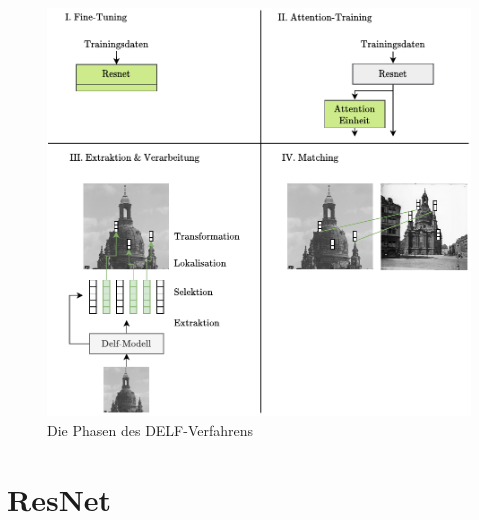 \begin{figure}[H]

\includegraphics[scale=1.0]{delf_stages.pdf}
\caption{Die Phasen des DELF-Verfahrens}
\label{delf_stages}
\end{figure}

\section{ResNet}

